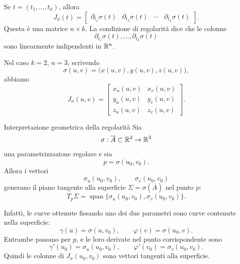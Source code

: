 \documentclass[a4paper]{article}
\begin{document}
\begin{radioactive}
Se \(t=(t_1,\ldots,t_k)\), allora
\[
    J_\sigma(t)
    =
    \begin{bmatrix}
        \partial_{t_1}\sigma(t) & \partial_{t_2}\sigma(t) & \cdots & \partial_{t_k}\sigma(t)
    \end{bmatrix}.
\]
Questa è una matrice \(n\times k\). La condizione di regolarità dice che le colonne
\[
    \partial_{t_1}\sigma(t),\ldots,\partial_{t_k}\sigma(t)
\]
sono linearmente indipendenti in \(\mathbb{R}^n\).
\end{radioactive}

\begin{radioactive}
Nel caso \(k=2\), \(n=3\), scrivendo
\[
    \sigma(u,v)=\bigl(x(u,v),y(u,v),z(u,v)\bigr),
\]
abbiamo
\[
    J_\sigma(u,v)
    =
    \begin{bmatrix}
        x_u(u,v) & x_v(u,v)\\
        y_u(u,v) & y_v(u,v)\\
        z_u(u,v) & z_v(u,v)
    \end{bmatrix}.
\]
\end{radioactive}

\begin{radioactive}
\begin{snippetproposition}{Interpretazione geometrica della regolarità}
    Sia
    \[
        \sigma:\overline{A}\subset\mathbb{R}^2\to\mathbb{R}^3
    \]
    una parametrizzazione regolare e sia
    \[
        p=\sigma(u_0,v_0).
    \]
    Allora i vettori
    \[
        \sigma_u(u_0,v_0),
        \qquad
        \sigma_v(u_0,v_0)
    \]
    generano il piano tangente alla superficie \(\Sigma=\sigma(\overline{A})\) nel punto \(p\):
    \[
        T_p\Sigma
        =
        \operatorname{span}\{\sigma_u(u_0,v_0),\sigma_v(u_0,v_0)\}.
    \]
\end{snippetproposition}
\end{radioactive}

\begin{radioactive}
Infatti, le curve ottenute fissando uno dei due parametri sono curve contenute nella superficie:
\[
    \gamma(u)=\sigma(u,v_0),
    \qquad
    \varphi(v)=\sigma(u_0,v).
\]
Entrambe passano per \(p\), e le loro derivate nel punto corrispondente sono
\[
    \gamma'(u_0)=\sigma_u(u_0,v_0),
    \qquad
    \varphi'(v_0)=\sigma_v(u_0,v_0).
\]
Quindi le colonne di \(J_\sigma(u_0,v_0)\) sono vettori tangenti alla superficie.
\end{radioactive}
\end{document}
